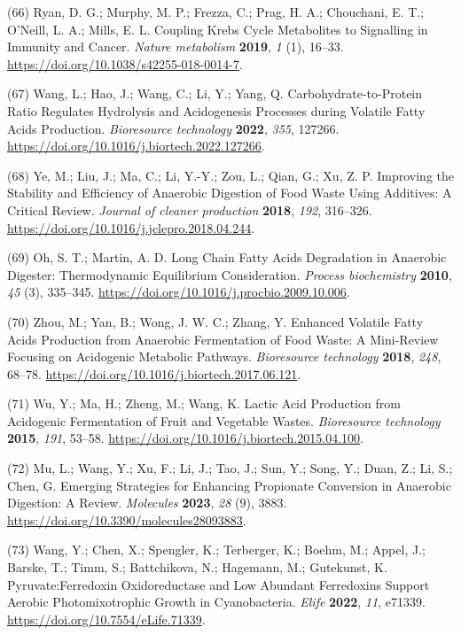 \documentclass[11pt]{report}
\begin{document}
\hypertarget{citeproc_bib_item_66}{(66) Ryan, D. G.; Murphy, M. P.; Frezza, C.; Prag, H. A.; Chouchani, E. T.; O’Neill, L. A.; Mills, E. L. Coupling Krebs Cycle Metabolites to Signalling in Immunity and Cancer. \textit{Nature metabolism} \textbf{2019}, \textit{1} (1), 16–33. \url{https://doi.org/10.1038/s42255-018-0014-7}.}

\hypertarget{citeproc_bib_item_67}{(67) Wang, L.; Hao, J.; Wang, C.; Li, Y.; Yang, Q. Carbohydrate-to-Protein Ratio Regulates Hydrolysis and Acidogenesis Processes during Volatile Fatty Acids Production. \textit{Bioresource technology} \textbf{2022}, \textit{355}, 127266. \url{https://doi.org/10.1016/j.biortech.2022.127266}.}

\hypertarget{citeproc_bib_item_68}{(68) Ye, M.; Liu, J.; Ma, C.; Li, Y.-Y.; Zou, L.; Qian, G.; Xu, Z. P. Improving the Stability and Efficiency of Anaerobic Digestion of Food Waste Using Additives: A Critical Review. \textit{Journal of cleaner production} \textbf{2018}, \textit{192}, 316–326. \url{https://doi.org/10.1016/j.jclepro.2018.04.244}.}

\hypertarget{citeproc_bib_item_69}{(69) Oh, S. T.; Martin, A. D. Long Chain Fatty Acids Degradation in Anaerobic Digester: Thermodynamic Equilibrium Consideration. \textit{Process biochemistry} \textbf{2010}, \textit{45} (3), 335–345. \url{https://doi.org/10.1016/j.procbio.2009.10.006}.}

\hypertarget{citeproc_bib_item_70}{(70) Zhou, M.; Yan, B.; Wong, J. W. C.; Zhang, Y. Enhanced Volatile Fatty Acids Production from Anaerobic Fermentation of Food Waste: A Mini-Review Focusing on Acidogenic Metabolic Pathways. \textit{Bioresource technology} \textbf{2018}, \textit{248}, 68–78. \url{https://doi.org/10.1016/j.biortech.2017.06.121}.}

\hypertarget{citeproc_bib_item_71}{(71) Wu, Y.; Ma, H.; Zheng, M.; Wang, K. Lactic Acid Production from Acidogenic Fermentation of Fruit and Vegetable Wastes. \textit{Bioresource technology} \textbf{2015}, \textit{191}, 53–58. \url{https://doi.org/10.1016/j.biortech.2015.04.100}.}

\hypertarget{citeproc_bib_item_72}{(72) Mu, L.; Wang, Y.; Xu, F.; Li, J.; Tao, J.; Sun, Y.; Song, Y.; Duan, Z.; Li, S.; Chen, G. Emerging Strategies for Enhancing Propionate Conversion in Anaerobic Digestion: A Review. \textit{Molecules} \textbf{2023}, \textit{28} (9), 3883. \url{https://doi.org/10.3390/molecules28093883}.}

\hypertarget{citeproc_bib_item_73}{(73) Wang, Y.; Chen, X.; Spengler, K.; Terberger, K.; Boehm, M.; Appel, J.; Barske, T.; Timm, S.; Battchikova, N.; Hagemann, M.; Gutekunst, K. Pyruvate:Ferredoxin Oxidoreductase and Low Abundant Ferredoxins Support Aerobic Photomixotrophic Growth in Cyanobacteria. \textit{Elife} \textbf{2022}, \textit{11}, e71339. \url{https://doi.org/10.7554/eLife.71339}.}
\end{document}
